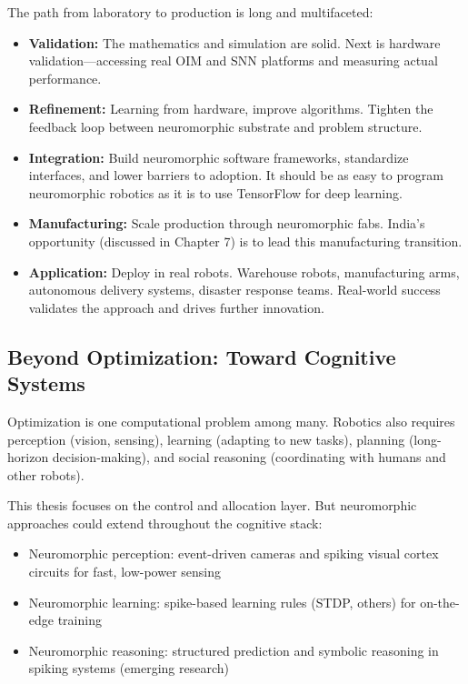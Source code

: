 The path from laboratory to production is long and multifaceted:

\begin{itemize}
\item \textbf{Validation:} The mathematics and simulation are solid. Next is hardware validation—accessing real OIM and SNN platforms and measuring actual performance.

\item \textbf{Refinement:} Learning from hardware, improve algorithms. Tighten the feedback loop between neuromorphic substrate and problem structure.

\item \textbf{Integration:} Build neuromorphic software frameworks, standardize interfaces, and lower barriers to adoption. It should be as easy to program neuromorphic robotics as it is to use TensorFlow for deep learning.

\item \textbf{Manufacturing:} Scale production through neuromorphic fabs. India's opportunity (discussed in Chapter 7) is to lead this manufacturing transition.

\item \textbf{Application:} Deploy in real robots. Warehouse robots, manufacturing arms, autonomous delivery systems, disaster response teams. Real-world success validates the approach and drives further innovation.
\end{itemize}

\subsection{Beyond Optimization: Toward Cognitive Systems}

Optimization is one computational problem among many. Robotics also requires perception (vision, sensing), learning (adapting to new tasks), planning (long-horizon decision-making), and social reasoning (coordinating with humans and other robots).

This thesis focuses on the control and allocation layer. But neuromorphic approaches could extend throughout the cognitive stack:

\begin{itemize}
\item Neuromorphic perception: event-driven cameras and spiking visual cortex circuits for fast, low-power sensing
\item Neuromorphic learning: spike-based learning rules (STDP, others) for on-the-edge training
\item Neuromorphic reasoning: structured prediction and symbolic reasoning in spiking systems (emerging research)
\end{itemize}

